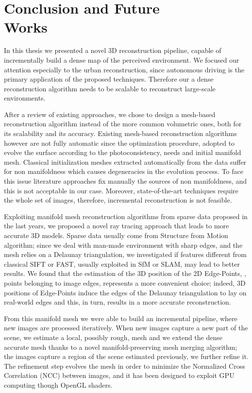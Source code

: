 \chapter[Conclusion and Future Works]{Conclusion and Future \\Works}
\label{ch:future_works}
In this thesis we presented a novel 3D reconstruction pipeline, capable of incrementally build a dense map of the perceived environment.
We focused our attention especially to the urban reconstruction, since autonomous driving is the primary application of the proposed techniques.
Therefore our a dense reconstruction algorithm needs to be scalable  to reconstruct large-scale environments.


After a review of existing approaches, we chose to design a mesh-based reconstruction algorithm instead of the more common volumetric ones, both for its scalability and its accuracy. 
Existing mesh-based reconstruction algorithms however are not fully automatic since the optimization procedure, adopted to evolve the surface according to the photoconsistency, needs and initial manifold mesh. 
Classical initialization meshes extracted automatically from the data suffer for non manifoldness which causes degeneracies in the evolution process. 
To face this issue literature approaches fix manually the sources of non manifoldness, and this is not acceptable in our case. 
Moreover, state-of-the-art techniques require the whole set of images, therefore, incremental reconstruction is not feasible.

Exploiting  manifold mesh reconstruction algorithms from sparse data proposed in the last years, we proposed a  novel ray tracing approach that leads to more accurate 3D models. 
Sparse data usually come from Structure from Motion algorithm; since we deal with man-made environment with sharp edges, and the mesh relies on a Delaunay triangulation, we investigated if features different from classical SIFT or FAST, usually exploited in SfM or SLAM, may lead to better results. 
We found that the estimation of the 3D position of the 2D Edge-Points, \ie, points belonging to image edges, represents a more convenient choice; indeed, 3D positions of Edge-Points induce the edges of the Delaunay triangulation to lay on real-world edges and this, in turn, results in a more accurate reconstruction.

From this manifold mesh we were able to build an incremental pipeline, where new images are processed iteratively.
When new images  capture a new part of the scene, we estimate a local, possibly rough, mesh and we extend the dense accurate mesh thanks to a novel manifold-preserving mesh merging algorithm; the images capture a region of the scene estimated previously, we further refine it.
The refinement step evolves the mesh in order to minimize the Normalized Cross Correlation (NCC) between images, and it has been designed to exploit GPU computing though OpenGL shaders.

